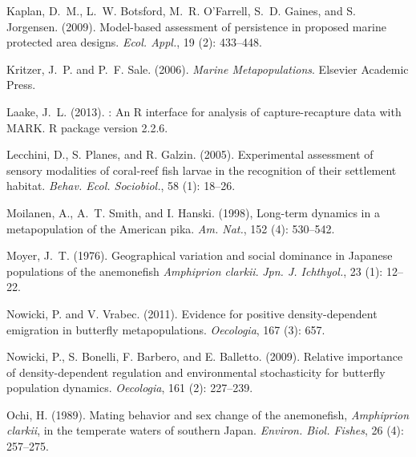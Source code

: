 \documentclass[12pt, oneside]{article}   	%
\begin{document}
\begin{thebibliography}{66}
Kaplan, D.~M., L.~W. Botsford, M.~R. O'Farrell, S.~D. Gaines, and
  S. Jorgensen. (2009).
\newblock Model-based assessment of persistence in proposed marine protected
  area designs.
\newblock \emph{Ecol. Appl.}, 19 (2): 433--448.

Kritzer, J.~P. and P.~F. Sale. (2006).
\newblock \emph{Marine Metapopulations}.
\newblock Elsevier Academic Press.

Laake, J.~L. (2013).
: An R interface for analysis of capture-recapture data with
  {MARK}.
\newblock R package version 2.2.6.

Lecchini, D., S. Planes, and R. Galzin. (2005).
\newblock Experimental assessment of sensory modalities of coral-reef fish
  larvae in the recognition of their settlement habitat.
\newblock \emph{Behav. Ecol. Sociobiol.}, 58 (1):
  18--26.

Moilanen, A., A.~T. Smith, and I. Hanski. (1998),
\newblock Long-term dynamics in a metapopulation of the American pika.
\newblock \emph{Am. Nat.}, 152 (4): 530--542.

Moyer, J.~T. (1976).
\newblock Geographical variation and social dominance in Japanese populations
  of the anemonefish \textit{Amphiprion clarkii}.
\newblock \emph{Jpn. J. Ichthyol.}, 23 (1):
  12--22.

Nowicki, P. and V. Vrabec. (2011).
\newblock Evidence for positive density-dependent emigration in butterfly
  metapopulations.
\newblock \emph{Oecologia}, 167 (3): 657.

Nowicki, P., S. Bonelli, F. Barbero, and E. Balletto. (2009).
\newblock Relative importance of density-dependent regulation and environmental
  stochasticity for butterfly population dynamics.
\newblock \emph{Oecologia}, 161 (2): 227--239.

Ochi, H. (1989).
\newblock Mating behavior and sex change of the anemonefish, \textit{Amphiprion
  clarkii}, in the temperate waters of southern Japan.
\newblock \emph{Environ. Biol. Fishes}, 26 (4):
  257--275.


\end{thebibliography}
\end{document}
